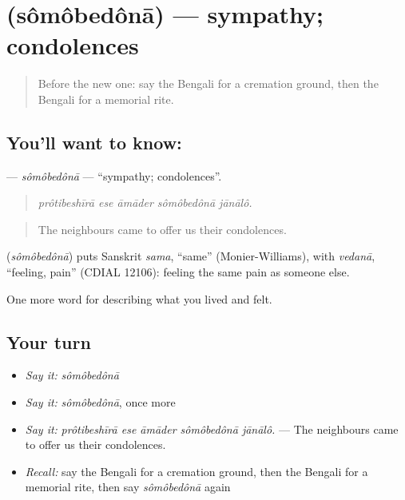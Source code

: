 \section[\texorpdfstring{\bn{সমবেদনা} (sômôbedônā)}{সমবেদনা (sômôbedônā)}]{ (sômôbedônā) — sympathy; condolences}

\label{lesson:BN-C491-somobedona}



\begin{quote}
Before the new one: say the Bengali for a cremation ground, then the Bengali for a memorial rite.
\end{quote}

\subsection*{You'll want to know: }
\textbf{} — \emph{sômôbedônā} — \textquotedblleft{}sympathy; condolences\textquotedblright{}.

\begin{quote}
    
\end{quote}

\begin{quote}
\emph{prôtibeshīrā ese āmāder sômôbedônā jānālô.}
\end{quote}

\begin{quote}
The neighbours came to offer us their condolences.
\end{quote}

\begin{cousinweb}
\textbf{} (\emph{sômôbedônā}) puts Sanskrit \emph{sama}, \textquotedblleft{}same\textquotedblright{} (Monier-Williams), with \emph{vedanā}, \textquotedblleft{}feeling, pain\textquotedblright{} (CDIAL 12106): feeling the same pain as someone else.
\end{cousinweb}

\begin{grammarlens}[title={What you've built}]
One more word for describing what you lived and felt.
\end{grammarlens}

\subsection*{Your turn}
\begin{itemize}
\raggedright
  \item \emph{Say it:} \emph{sômôbedônā}
  \item \emph{Say it:} \emph{sômôbedônā}, once more
  \item \emph{Say it:} \emph{prôtibeshīrā ese āmāder sômôbedônā jānālô.} — The neighbours came to offer us their condolences.
  \item \emph{Recall:} say the Bengali for a cremation ground, then the Bengali for a memorial rite, then say \emph{sômôbedônā} again
\end{itemize}

